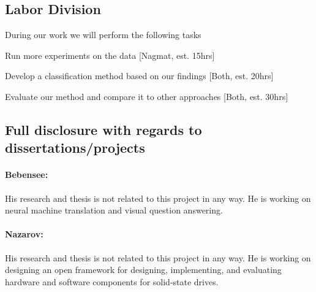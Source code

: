 \subsection{Labor Division}

During our work we will perform the following tasks
\bit
\item Run more experiments on the data [Nagmat, est. 15hrs]
\item Develop a classification method based on our findings [Both, est. 20hrs]
\item Evaluate our method and compare it to other approaches [Both, est. 30hrs]
\eit

\subsection{Full disclosure with regards to dissertations/projects}

\paragraph{Bebensee:}
His research and thesis is not related to this project in any way. He is working on neural machine translation and visual question answering.

\paragraph{Nazarov:}
His research and thesis is not related to this project in any way. He is working on designing an open framework for designing, implementing, and evaluating hardware and software components for solid-state drives. 